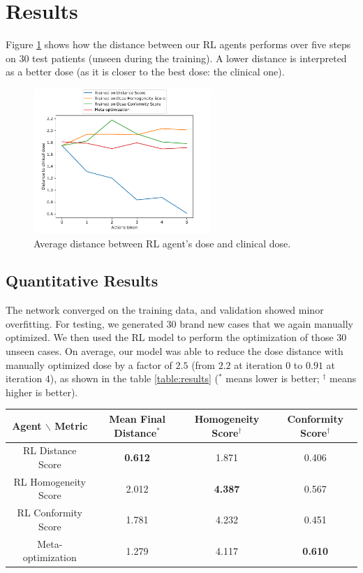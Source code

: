 \section{Results}
Figure \ref{fig:distance} shows how the distance between our RL agents performs over five steps on 30 test patients (unseen during the training).
A lower distance is interpreted as a better dose (as it is closer to the best dose: the clinical one).
\begin{figure}
	\centering
	\includegraphics[width=0.6\textwidth]{DistanceToClinicalDose.pdf}
	\caption{Average distance between RL agent's dose and clinical dose.}
	\label{fig:distance}
\end{figure}


\subsection{Quantitative Results}
The network converged on the training data, and validation showed minor overfitting.
For testing, we generated 30 brand new cases that we again manually optimized.
We then used the RL model to perform the optimization of those 30 unseen cases.
On average, our model was able to reduce the dose distance with manually optimized dose by a factor of $2.5$ (from $2.2$ at iteration $0$ to $0.91$ at iteration $4$), as shown in the table \ref{table:results} ($^*$ means lower is better; $^\dagger$ means higher is better).

\begin{center}
	\begin{tabular}{| c || c | c | c |} 
		\hline
		Agent $\backslash$ Metric & Mean Final Distance$^*$ & Homogeneity Score$^\dagger$ & Conformity Score$^\dagger$ \\ 
		\hline
		RL Distance Score & \textbf{0.612} & 1.871 & 0.406 \\ 
		RL Homogeneity Score & 2.012 & \textbf{4.387} & 0.567 \\
		RL Conformity Score &  1.781  & 4.232 & 0.451 \\
		Meta-optimization & 1.279 & 4.117 & \textbf{0.610} \\	
		\hline
	\end{tabular}
	\label{table:results}
\end{center}


